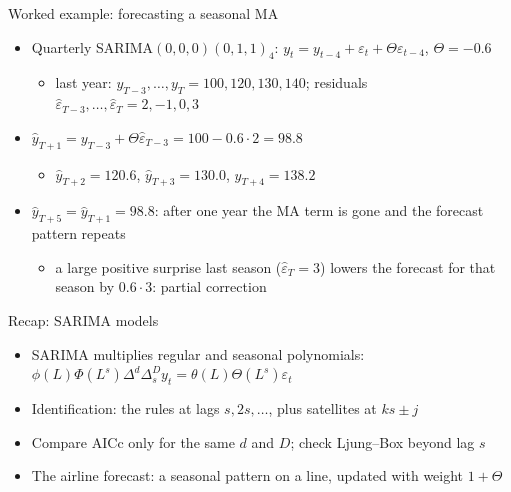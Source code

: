 \begin{frame}{Worked example: forecasting a seasonal MA}
\itemsize{\small}
\begin{itemize}
    \item Quarterly SARIMA$(0,0,0)(0,1,1)_4$: $y_t = y_{t-4} + \varepsilon_t + \Theta\varepsilon_{t-4}$, $\Theta = -0.6$
    \begin{itemize}
        \item last year: $y_{T-3}, \dots, y_T = 100, 120, 130, 140$; residuals $\hat\varepsilon_{T-3}, \dots, \hat\varepsilon_T = 2, -1, 0, 3$
    \end{itemize}
    \item $\hat y_{T+1} = y_{T-3} + \Theta\hat\varepsilon_{T-3} = 100 - 0.6 \cdot 2 = 98.8$
    \begin{itemize}
        \item $\hat y_{T+2} = 120.6$, $\hat y_{T+3} = 130.0$, $\hat y_{T+4} = 138.2$
    \end{itemize}
    \item $\hat y_{T+5} = \hat y_{T+1} = 98.8$: after one year the MA term is gone and the forecast pattern repeats
    \begin{itemize}
        \item a large positive surprise last season ($\hat\varepsilon_T = 3$) lowers the forecast for that season by $0.6 \cdot 3$: partial correction
    \end{itemize}
\end{itemize}
\end{frame}

\begin{frame}{Recap: SARIMA models}
\itemsize{\small}
\begin{itemize}
    \item SARIMA multiplies regular and seasonal polynomials: $\phi(L)\Phi(L^s)\Delta^d\Delta_s^Dy_t = \theta(L)\Theta(L^s)\varepsilon_t$
    \item Identification: the  rules at lags $s, 2s, \dots$, plus satellites at $ks \pm j$
    \item Compare AICc only for the same $d$ and $D$; check Ljung--Box beyond lag $s$
    \item The airline forecast: a seasonal pattern on a line, updated with weight $1 + \Theta$
\end{itemize}
\end{frame}


